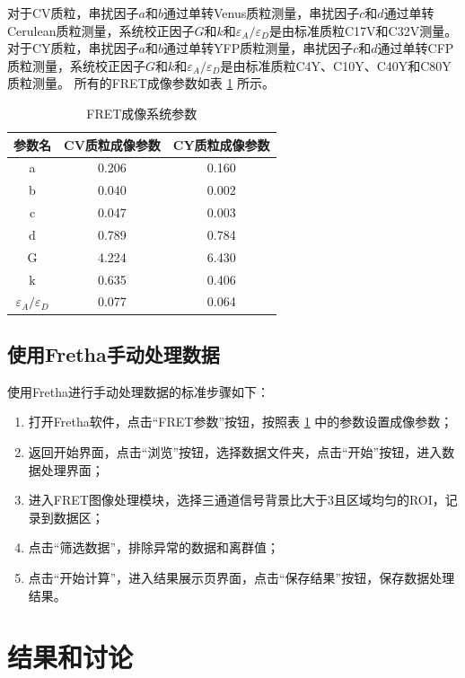 对于CV质粒，串扰因子$a$和$b$通过单转Venus质粒测量，串扰因子$c$和$d$通过单转Cerulean质粒测量，系统校正因子$G$和$k$和$\varepsilon_{A}/\varepsilon_{D}$是由标准质粒C17V和C32V测量。
对于CY质粒，串扰因子$a$和$b$通过单转YFP质粒测量，串扰因子$c$和$d$通过单转CFP质粒测量，系统校正因子$G$和$k$和$\varepsilon_{A}/\varepsilon_{D}$是由标准质粒C4Y、C10Y、C40Y和C80Y质粒测量。
所有的FRET成像参数如表 \ref{tab:lurs_imaging_params} 所示。

\begin{table}[htbp]
    \centering
    \caption{FRET成像系统参数}
    \begin{tabular}{ccc}
        \toprule[1.5pt]
        参数名 & CV质粒成像参数 & CY质粒成像参数 \\
        \midrule
        a & 0.206 & 0.160\\
        b & 0.040 & 0.002\\
        c & 0.047 & 0.003\\
        d & 0.789 & 0.784\\
        G & 4.224 & 6.430\\
        k & 0.635 & 0.406\\
        $\varepsilon_{A}/\varepsilon_{D}$ & 0.077 & 0.064\\
        \bottomrule[1.5pt]
    \end{tabular}
    \label{tab:lurs_imaging_params}
\end{table}

\subsection{使用Fretha手动处理数据}
\label{sec:Fretha手动处理数据}
使用Fretha进行手动处理数据的标准步骤如下：
\begin{enumerate}
  \item 打开Fretha软件，点击“FRET参数”按钮，按照表 \ref{tab:lurs_imaging_params} 中的参数设置成像参数；
  \item 返回开始界面，点击“浏览”按钮，选择数据文件夹，点击“开始”按钮，进入数据处理界面；
  \item 进入FRET图像处理模块，选择三通道信号背景比大于3且区域均匀的ROI，记录到数据区；
  \item 点击“筛选数据”，排除异常的数据和离群值；
  \item 点击“开始计算”，进入结果展示页界面，点击“保存结果”按钮，保存数据处理结果。
\end{enumerate}

\section{结果和讨论}

